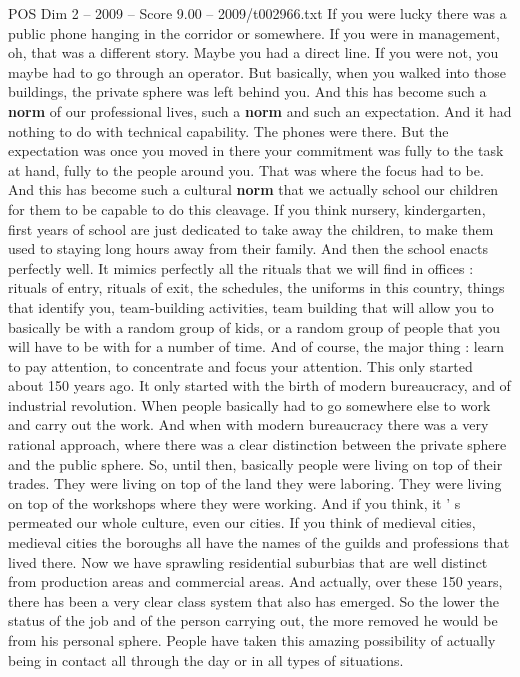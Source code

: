 \begin{textsample}{POS Dim 2 – 2009 – Score 9.00 – 2009/t002966.txt}
If you were lucky there was a public phone hanging in the corridor or somewhere.
If you were in management, oh, that was a different story.
Maybe you had a direct line.
If you were not, you maybe had to go through an operator.
But basically, when you walked into those buildings, the private sphere was left behind you.
And this has become such a \textbf{norm} of our professional lives, such a \textbf{norm} and such an expectation.
And it had nothing to do with technical capability.
The phones were there.
But the expectation was once you moved in there your commitment was fully to the task at hand, fully to the people around you.
That was where the focus had to be.
And this has become such a cultural \textbf{norm} that we actually school our children for them to be capable to do this cleavage.
If you think nursery, kindergarten, first years of school are just dedicated to take away the children, to make them used to staying long hours away from their family.
And then the school enacts perfectly well.
It mimics perfectly all the rituals that we will find in offices : rituals of entry, rituals of exit, the schedules, the uniforms in this country, things that identify you, team-building activities, team building that will allow you to basically be with a random group of kids, or a random group of people that you will have to be with for a number of time.
And of course, the major thing : learn to pay attention, to concentrate and focus your attention.
This only started about 150 years ago.
It only started with the birth of modern bureaucracy, and of industrial revolution.
When people basically had to go somewhere else to work and carry out the work.
And when with modern bureaucracy there was a very rational approach, where there was a clear distinction between the private sphere and the public sphere.
So, until then, basically people were living on top of their trades.
They were living on top of the land they were laboring.
They were living on top of the workshops where they were working.
And if you think, it ' s permeated our whole culture, even our cities.
If you think of medieval cities, medieval cities the boroughs all have the names of the guilds and professions that lived there.
Now we have sprawling residential suburbias that are well distinct from production areas and commercial areas.
And actually, over these 150 years, there has been a very clear class system that also has emerged.
So the lower the status of the job and of the person carrying out, the more removed he would be from his personal sphere.
People have taken this amazing possibility of actually being in contact all through the day or in all types of situations.

\end{textsample}
